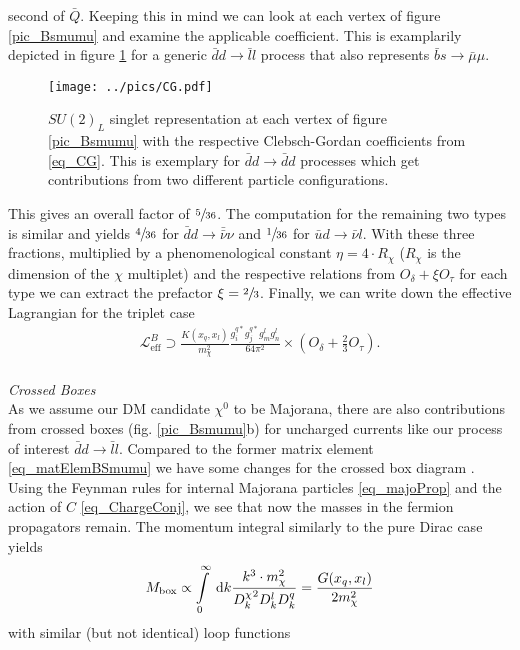 second of $\bar Q$. Keeping this in mind we can look at each vertex of figure \ref{pic_Bsmumu} and examine the applicable coefficient. This is examplarily
depicted in figure \ref{pic_CG} for a generic $\bar d d\rightarrow \bar l l$ process that also represents $\bar b s \rightarrow \bar \mu \mu$.
\begin{figure}[t]
 \texttt{[image: ../pics/CG.pdf]}
 \caption{$SU(2)_L$ singlet representation at each vertex of figure \ref{pic_Bsmumu} with the respective Clebsch-Gordan coefficients from \eqref{eq_CG}. 
 This is exemplary for $\bar d d\rightarrow \bar d d$ processes which get contributions from two different particle configurations.}
 \label{pic_CG}
\end{figure}
This gives an overall factor of $\sfrac{5}{36}$. The computation for the remaining two types is similar and yields $\sfrac{4}{36}$ for 
$\bar d d\rightarrow \bar \bar \nu \nu$ and $\sfrac{1}{36}$ for $\bar u d \rightarrow \bar \nu l$. With these three fractions, multiplied by a 
phenomenological constant $\eta=4\cdot R_\chi$ ($R_\chi$ is the dimension of the $\chi$ multiplet) and the respective relations from 
$O_\delta + \xi O_\tau$ for each type 
we can extract the prefactor $\xi=\sfrac23$. Finally, we can write down the effective Lagrangian for the triplet case
\begin{align}
 \mathcal{L}^B_\text{eff} \supset \frac{K(x_q,x_l)}{m_\chi^2}\frac{g_i^{q*} g_j^{q*} g_m^l g_n^l}{64\pi^2}\times\left(O_\delta + \frac23 O_\tau\right).
 \label{eq_LagBSmumuModB}
\end{align}
\\ \textit{Crossed Boxes}\\
\noindent As we assume our DM candidate $\chi^0$ to be Majorana, there are also contributions from crossed boxes (fig. \ref{pic_Bsmumu}b) for uncharged
currents like our process of interest $\bar d d\rightarrow \bar l l$. Compared to the former matrix element \eqref{eq_matElemBSmumu} we have some changes
for the crossed box diagram \cite{1411.6743}. Using the Feynman rules for internal Majorana particles \eqref{eq_majoProp} and the action of $C$ \eqref{eq_ChargeConj}, 
we see that now the masses in the fermion propagators remain. The momentum integral similarly to the pure Dirac case yields
\begin{align}
 M_\text{box} \propto \int\limits_0^\infty \; \mathrm{d} k \frac{k^3 \cdot m_\chi^2}{{D^\chi_k}^2D^l_k D^q_k} = \frac{G(x_q,x_l)}{2m_\chi^2}
 \label{eq_crossedBox}
\end{align}
with similar (but not identical) loop functions
